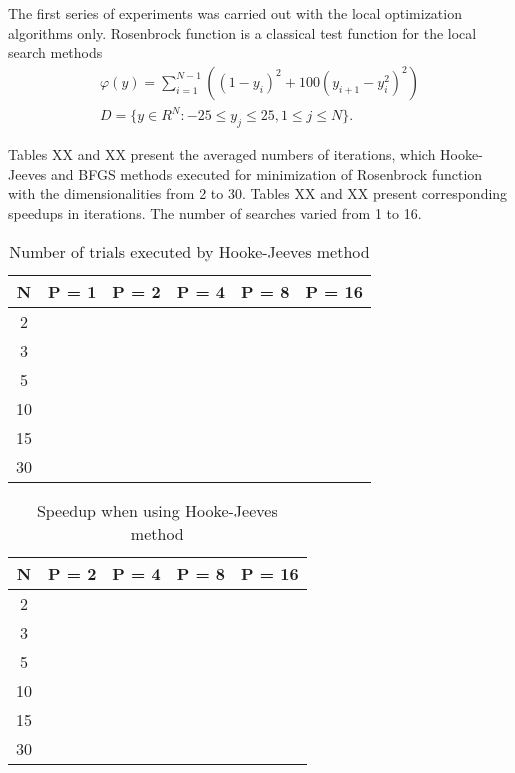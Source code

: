 \documentclass[runningheads]{llncs}
\begin{document}
The first series of experiments was carried out with the local optimization algorithms only. Rosenbrock function is a classical test function for the local search methods 
\begin{gather}
    \varphi(y) = \sum_{i=1}^{N-1} \left((1-y_i)^2 + 100(y_{i+1} - y_i^2)^2\right) \nonumber \\
    D = \{ y \in R^N: -25 \leq y_j \leq 25, 1 \leq j \leq N \}. \nonumber
\end{gather}

Tables XX and XX present the averaged numbers of iterations, which Hooke-Jeeves and BFGS methods executed for minimization of Rosenbrock function with the dimensionalities from 2 to 30. Tables XX and XX present corresponding speedups in iterations. The number of searches varied from 1 to 16. 

\begin{table}[ht]
	\caption{Number of trials executed by Hooke-Jeeves method}
	\label{tab:1}
	\center
	\begin{tabular}{|c|c|c|c|c|c|}
		\hline
		N & P = 1 & P = 2 & P = 4 & P = 8 & P = 16 \\
		\hline 
		2 &	 &  &  &  &   \\
		\hline
		3 &	 &  &  &  &   \\
		\hline
		5 &	 &  &  &  &   \\
		\hline
		10 &  &  &  &  &   \\
		\hline
		15 &  &  &  &  &   \\
		\hline
		30 &  &  &  &  &   \\
		\hline
	\end{tabular}
\end{table}

\begin{table}[ht]
	\caption{Speedup when using Hooke-Jeeves method}
	\label{tab:2}
	\center
	\begin{tabular}{|c|c|c|c|c|}
		\hline
		N & P = 2 & P = 4 & P = 8 & P = 16 \\
		\hline 
		2 &  &  &  &   \\
		\hline
		3 &  &  &  &   \\
		\hline
		5 &  &  &  &   \\
		\hline
		10 &  &  &  &   \\
		\hline
		15 &  &  &  &   \\
		\hline
		30 &  &  &  &   \\
		\hline
	\end{tabular}
\end{table}
\end{document}
